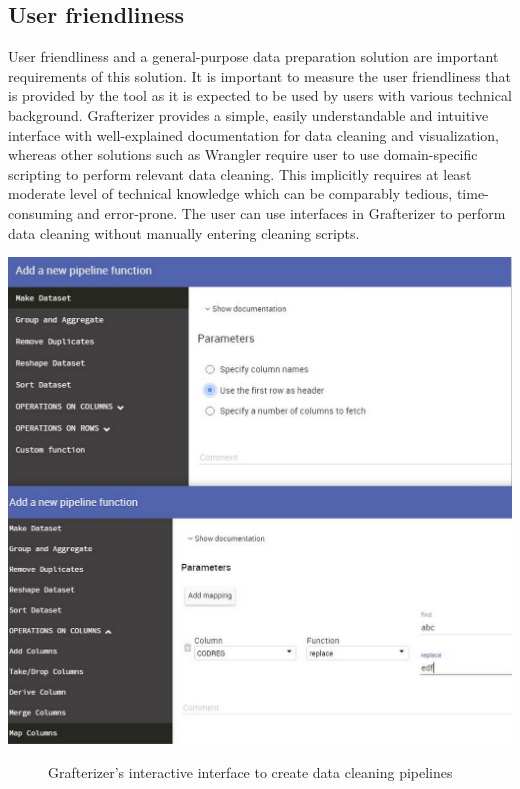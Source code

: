 
\subsection{User friendliness}
User friendliness and a general-purpose data preparation solution are important requirements of this solution. It is important to measure the user friendliness that is provided by the tool as it is expected to be used by users with various technical background. Grafterizer provides a simple, easily understandable and intuitive interface with well-explained documentation for  data cleaning and visualization, whereas other solutions such as Wrangler\cite{2011-wrangler, openrefine} require user to use domain-specific scripting to perform relevant data cleaning. This implicitly requires at least moderate level of technical knowledge which can be comparably tedious, time-consuming and error-prone. The user can use interfaces in Grafterizer to perform data cleaning without manually entering cleaning scripts. 
\begin{center}
	\includegraphics[width=38em]{./Figures/userinteraction}
	\begin{figure}[htbp]
    \caption{Grafterizer's interactive interface to create data cleaning pipelines}
    \label{fig:datacleaning}
	\end{figure}
\end{center}
